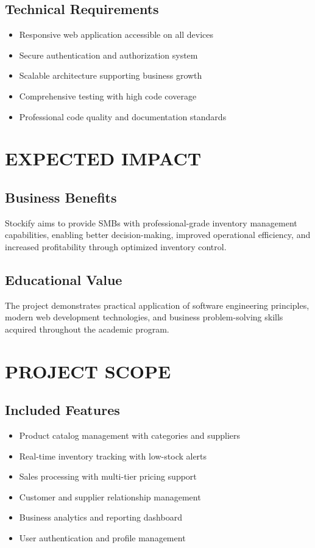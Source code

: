 \subsection{Technical Requirements}
\begin{itemize}
\item Responsive web application accessible on all devices
\item Secure authentication and authorization system
\item Scalable architecture supporting business growth
\item Comprehensive testing with high code coverage
\item Professional code quality and documentation standards
\end{itemize}

\section{EXPECTED IMPACT}

\subsection{Business Benefits}
Stockify aims to provide SMBs with professional-grade inventory management capabilities, enabling better decision-making, improved operational efficiency, and increased profitability through optimized inventory control.

\subsection{Educational Value}
The project demonstrates practical application of software engineering principles, modern web development technologies, and business problem-solving skills acquired throughout the academic program.

\section{PROJECT SCOPE}

\subsection{Included Features}
\begin{itemize}
\item Product catalog management with categories and suppliers
\item Real-time inventory tracking with low-stock alerts
\item Sales processing with multi-tier pricing support
\item Customer and supplier relationship management
\item Business analytics and reporting dashboard
\item User authentication and profile management
\end{itemize}

